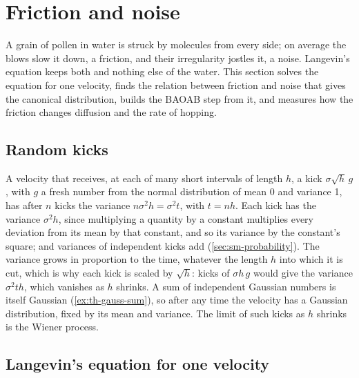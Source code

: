 \section{Friction and noise}
\label{sec:th-langevin}

A grain of pollen in water is struck by molecules from every side; on
average the blows slow it down, a friction, and their irregularity jostles
it, a noise. Langevin's equation keeps both and nothing else of the
water. This section solves the equation for one velocity, finds the
relation between friction and noise that gives the canonical
distribution, builds the BAOAB step from it, and measures how the
friction changes diffusion and the rate of hopping.

\subsection*{Random kicks}

\begin{toolbox}
A velocity that receives, at each of many short intervals of length $h$,
a kick $\sigma\sqrt h\,g$, with $g$ a fresh number from the normal
distribution of mean 0 and variance 1, has after $n$ kicks the variance
$n\sigma^2h = \sigma^2t$, with $t = nh$. Each kick has the variance
$\sigma^2h$, since multiplying a quantity by a constant multiplies every
deviation from its mean by that constant, and so its variance by the
constant's square; and variances of independent kicks add
(\cref{sec:sm-probability}). The variance grows in proportion to the
time, whatever the length $h$ into which it is cut, which is why each
kick is scaled by $\sqrt h$: kicks of $\sigma h\,g$ would give the
variance $\sigma^2th$, which vanishes as $h$ shrinks. A sum of independent
Gaussian numbers is itself Gaussian (\cref{ex:th-gauss-sum}), so after
any time the velocity has a Gaussian distribution, fixed by its mean and
variance. The limit of such kicks as $h$ shrinks is the Wiener process.
\end{toolbox}

\subsection*{Langevin's equation for one velocity}


